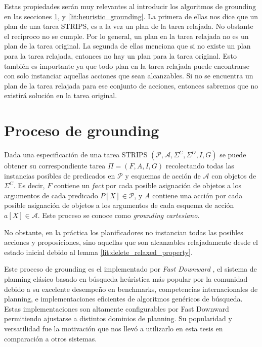 Estas propiedades serán muy relevantes al introducir los algoritmos de grounding en las secciones \ref{lit:relaxed_grounding}, y \ref{lit:heuristic_grounding}. La primera de ellas nos dice que un plan de una tarea STRIPS, es a la vez un plan de la tarea relajada. No obstante el reciproco no se cumple. Por lo general, un plan en la tarea relajada no es un plan de la tarea original. La segunda de ellas menciona que si no existe un plan para la tarea relajada, entonces no hay un plan para la tarea original. Esto también es importante ya que todo plan en la tarea relajada puede encontrarse con solo instanciar aquellas acciones que sean alcanzables. Si no se encuentra un plan de la tarea relajada para ese conjunto de acciones, entonces sabremos que no existirá solución en la tarea original.

\section{Proceso de grounding}
\label{lit:relaxed_grounding}

Dada una especificación de una tarea STRIPS $(\mathcal{P}, \mathcal{A},
\Sigma^{C}, \Sigma^{O}, I, G)$ se puede obtener su correspondiente tarea $\Pi =
(F, A, I, G)$ recolectando todas las instancias posibles de predicados en
$\mathcal{P}$ y esquemas de acción de $\mathcal{A}$ con objetos de $\Sigma^{C}$.
Es decir, $F$ contiene un \emph{fact} por cada posible asignación de objetos a
los argumentos de cada predicado $P[X] \in \mathcal{P}$, y $A$ contiene una
acción por cada posible asignación de objetos a los argumentos de cada esquema
de acción $a[X] \in \mathcal{A}$. Este proceso se conoce como \emph{grounding
cartesiano}.

No obstante, en la práctica los planificadores no instancian todas las posibles
acciones y proposiciones, sino aquellas que son alcanzables relajadamente desde
el estado inicial debido al lemma \ref{lit:delete_relaxed_property}. 

Este proceso de grounding es el implementado por \emph{Fast Downward} \citep{Helmert-2011}, el sistema de planning clásico basado en búsqueda heúristica más popular por la comunidad debido a su excelente desempeño en benchmarks, competencias internacionales de planning, e implementaciones eficientes de algoritmos genéricos de búsqueda. Estas implementaciones son altamente configurables por Fast Downward permitiendo ajustarse a distintos dominios de planning. Su popularidad y versatilidad fue la motivación que nos llevó a utilizarlo en esta tesis en comparación a otros sistemas.

